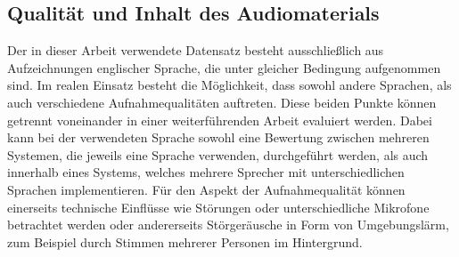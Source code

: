 \subsection{Qualität und Inhalt des Audiomaterials}
Der in dieser Arbeit verwendete Datensatz besteht ausschließlich aus Aufzeichnungen englischer Sprache, die unter gleicher Bedingung aufgenommen sind.
Im realen Einsatz besteht die Möglichkeit, dass sowohl andere Sprachen, als auch verschiedene Aufnahmequalitäten auftreten.
Diese beiden Punkte können getrennt voneinander in einer weiterführenden Arbeit evaluiert werden.
Dabei kann bei der verwendeten Sprache sowohl eine Bewertung zwischen mehreren Systemen, die jeweils eine Sprache verwenden, durchgeführt werden, als auch innerhalb eines Systems, welches mehrere Sprecher mit unterschiedlichen Sprachen implementieren.
Für den Aspekt der Aufnahmequalität können einerseits technische Einflüsse wie Störungen oder unterschiedliche Mikrofone betrachtet werden oder andererseits Störgeräusche in Form von Umgebungslärm, zum Beispiel durch Stimmen mehrerer Personen im Hintergrund.
